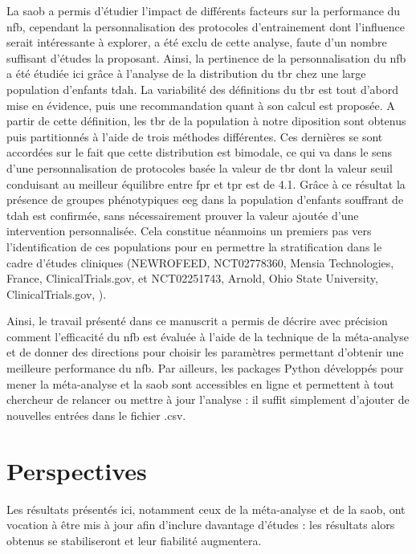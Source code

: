 La \gls{saob} a permis d'étudier l'impact de différents facteurs sur la performance du \gls{nfb}, cependant la personnalisation 
des protocoles d'entrainement dont l'influence serait intéressante 
à explorer, a été exclu de cette analyse, faute d'un nombre suffisant d'études la proposant. Ainsi, la pertinence de la personnalisation 
du \gls{nfb} a été étudiée ici grâce à l'analyse de la distribution 
du \gls{tbr} chez une large population d'enfants \gls{tdah}. La variabilité des définitions du \gls{tbr} est tout d'abord mise en 
évidence, puis une recommandation quant à son calcul est proposée. A partir de cette définition, les \gls{tbr} de la population à notre diposition
sont obtenus puis partitionnés à l'aide de trois méthodes différentes. Ces dernières se sont accordées sur le fait que cette distribution 
est bimodale, ce qui va dans 
le sens d'une personnalisation de protocoles basée la valeur de \gls{tbr} dont la valeur seuil conduisant au meilleur équilibre entre 
\gls{fpr} et \gls{tpr} est de 4.1. 
Grâce à ce résultat la présence de 
groupes phénotypiques \gls{eeg} dans la population d'enfants souffrant de \gls{tdah} est confirmée, sans nécessairement prouver la valeur ajoutée d'une 
intervention personnalisée. Cela constitue néanmoins un premiers pas vers l'identification de ces populations pour en 
permettre la stratification dans le cadre d'études cliniques (NEWROFEED, NCT02778360, Mensia Technologies, France, ClinicalTrials.gov, \citet{Bioulac2019} et NCT02251743, Arnold, Ohio State University, 
ClinicalTrials.gov, \citet{Kerson2013}).

Ainsi, le travail présenté dans ce manuscrit a permis de décrire avec précision comment l'efficacité du \gls{nfb} est évaluée à l'aide de 
la technique de la méta-analyse et de donner des 
directions pour choisir les paramètres permettant d'obtenir une meilleure performance du \gls{nfb}. Par ailleurs, les packages Python développés pour mener 
la méta-analyse et la \gls{saob}
sont accessibles en ligne et permettent à tout chercheur de relancer ou mettre à jour l'analyse : il suffit simplement d'ajouter de nouvelles 
entrées dans le fichier .csv.


\section{Perspectives}

Les résultats présentés ici, notamment ceux de la méta-analyse et de la \gls{saob}, ont vocation à être mis à jour afin d'inclure davantage 
d'études : les résultats alors obtenus se stabiliseront et leur fiabilité augmentera.   

